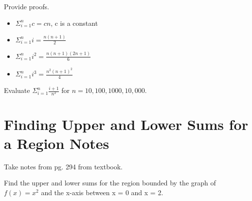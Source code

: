 \documentclass{article}
\theoremstyle{mytheoremstyle}
\theoremstyle{mytheoremstyle}
\theoremstyle{myproblemstyle}
\begin{document}
    \newpage

    \begin{theorem}
        Provide proofs. 
        \begin{itemize}
            \item $ \Sigma_{i=1}^n c = cn$, c is a constant
            \item $ \Sigma_{i=1}^n i = \frac{n(n+1)}{2}$
            \item $ \Sigma_{i=1}^n i^2 = \frac{n(n+1)(2n+1)}{6}$
            \item $ \Sigma_{i=1}^n i^3 = \frac{n^2(n+1)^2}{4}$
        \end{itemize}
    \end{theorem}

    \begin{problem}
        Evaluate $ \Sigma_{i=1}^n \frac{i+1}{n^2} $ for $n = 10, 100, 1000, 10,000$.
    \end{problem}

    \newpage
    


    \section*{Finding Upper and Lower Sums for a Region Notes}
    Take notes from pg. 294 from textbook.
    \newpage
    

    \begin{problem}
        Find the upper and lower sums for the region bounded by the graph of $ f(x) = x^2 $
        and the x-axis between x = 0 and x = 2.

    \end{problem}

    \begin{problem}
        
    \end{problem}

    \begin{theorem}
        
    \end{theorem}

    \begin{definition}
        
    \end{definition}
\end{document}
